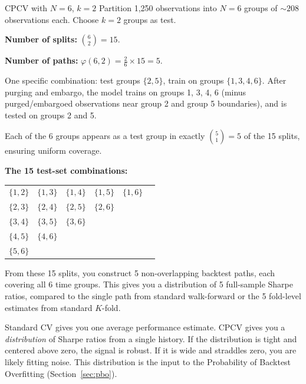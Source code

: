 \begin{workedexample}{CPCV with $N = 6$, $k = 2$}
Partition 1{,}250 observations into $N = 6$ groups of ${\sim}208$ observations each. Choose $k = 2$ groups as test.

\textbf{Number of splits:} $\binom{6}{2} = 15$.

\textbf{Number of paths:} $\varphi(6, 2) = \frac{2}{6} \times 15 = 5$.

One specific combination: test groups $\{2, 5\}$, train on groups $\{1, 3, 4, 6\}$. After purging and embargo, the model trains on groups 1, 3, 4, 6 (minus purged/embargoed observations near group 2 and group 5 boundaries), and is tested on groups 2 and 5.

Each of the 6 groups appears as a test group in exactly $\binom{5}{1} = 5$ of the 15 splits, ensuring uniform coverage.

\textbf{The 15 test-set combinations:}
\begin{center}
\begin{tabular}{cccccc}
\toprule
$\{1,2\}$ & $\{1,3\}$ & $\{1,4\}$ & $\{1,5\}$ & $\{1,6\}$ & \\
$\{2,3\}$ & $\{2,4\}$ & $\{2,5\}$ & $\{2,6\}$ & & \\
$\{3,4\}$ & $\{3,5\}$ & $\{3,6\}$ & & & \\
$\{4,5\}$ & $\{4,6\}$ & & & & \\
$\{5,6\}$ & & & & & \\
\bottomrule
\end{tabular}
\end{center}

From these 15 splits, you construct 5 non-overlapping backtest paths, each covering all 6 time groups. This gives you a distribution of 5 full-sample Sharpe ratios, compared to the single path from standard walk-forward or the 5 fold-level estimates from standard $K$-fold.
\end{workedexample}

\begin{keyidea}
Standard CV gives you one average performance estimate. CPCV gives you a \emph{distribution} of Sharpe ratios from a single history. If the distribution is tight and centered above zero, the signal is robust. If it is wide and straddles zero, you are likely fitting noise. This distribution is the input to the Probability of Backtest Overfitting (Section~\ref{sec:pbo}).
\end{keyidea}

